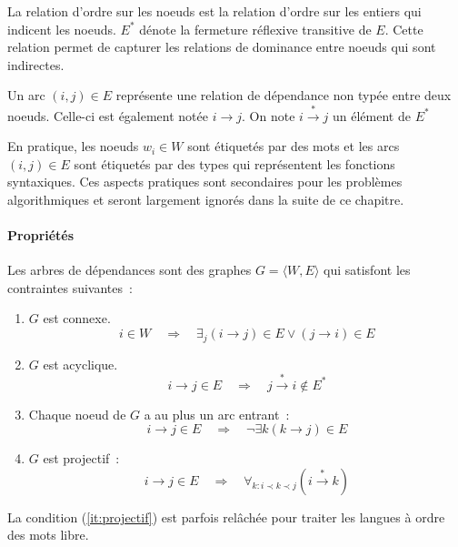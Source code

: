 \documentclass[11pt,openany]{book}
\begin{document}
La relation d'ordre sur les noeuds est la relation d'ordre sur les
entiers qui indicent les noeuds.
$E^*$ dénote la fermeture réflexive transitive de $E$. Cette relation
permet de capturer les relations de dominance entre noeuds qui sont indirectes.

Un arc $(i,j) \in E$ représente une relation de dépendance non typée entre
deux noeuds. Celle-ci est
également notée $i \rightarrow j$. 
On note $i\stackrel{*}{\rightarrow} j$ un élément de $E^*$

En pratique, les noeuds $w_i \in W$ sont étiquetés par des mots et les
arcs $(i,j) \in E$ sont étiquetés par des types qui représentent les
fonctions syntaxiques. Ces aspects pratiques sont secondaires pour les
problèmes algorithmiques et seront largement ignorés dans la suite de ce chapitre.


\paragraph{Propriétés}
Les arbres de dépendances sont des graphes $G = \langle W,E \rangle$ qui satisfont les
contraintes suivantes~:
\begin{enumerate}
\item $G$ est connexe. 
\begin{displaymath}
 i\in W \quad\Rightarrow\quad \exists_j (i \rightarrow j) \in E \lor
  (j\rightarrow i) \in E
\end{displaymath}
\item $G$ est acyclique. 
\begin{displaymath}
i \rightarrow j\in E \quad\Rightarrow\quad 
  j \stackrel{*}{\rightarrow} i \not \in E^*
\end{displaymath}
\item Chaque  noeud de $G$  a au plus un arc entrant~: 
\begin{displaymath}
i\rightarrow j  \in E \quad\Rightarrow\quad \lnot \exists k  (k\rightarrow j)\in E
\end{displaymath}
\item\label{it:projectif} $G$ est projectif~: 
\begin{displaymath}
 i\rightarrow j \in E \quad\Rightarrow\quad 
\forall_{k:i \prec k \prec j}  (i\stackrel{*}{\rightarrow} k)
\end{displaymath}
\end{enumerate}
La condition (\ref{it:projectif}) est parfois relâchée pour traiter
les langues à ordre des mots libre.
\end{document}
